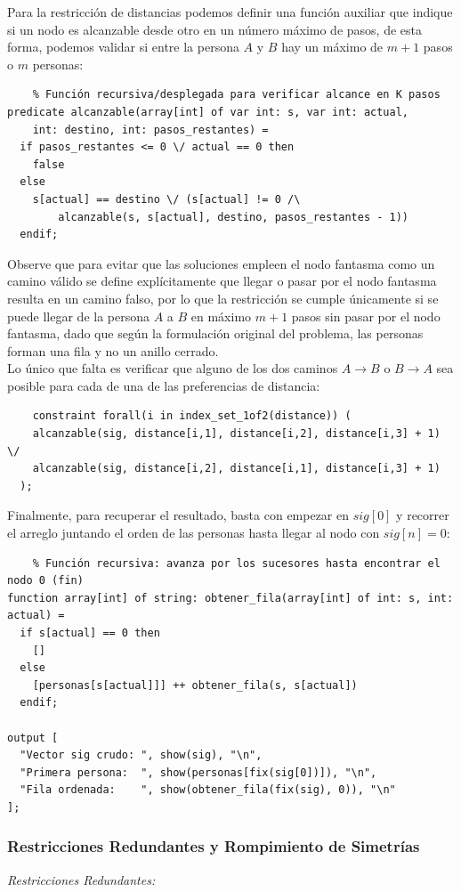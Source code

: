 Para la restricción de distancias podemos definir una función auxiliar que indique si un nodo es alcanzable desde otro en un número máximo de pasos, de esta forma, podemos validar si entre la persona $A$ y $B$ hay un máximo de $m+1$ pasos o $m$ personas:
\begin{verbatim}
    % Función recursiva/desplegada para verificar alcance en K pasos
predicate alcanzable(array[int] of var int: s, var int: actual,
    int: destino, int: pasos_restantes) =
  if pasos_restantes <= 0 \/ actual == 0 then
    false
  else
    s[actual] == destino \/ (s[actual] != 0 /\
        alcanzable(s, s[actual], destino, pasos_restantes - 1))
  endif;
\end{verbatim}
Observe que para evitar que las soluciones empleen el nodo fantasma como un camino válido se define explícitamente que llegar o pasar por el nodo fantasma resulta en un camino falso, por lo que la restricción se cumple únicamente si se puede llegar de la persona $A$ a $B$ en máximo $m+1$ pasos sin pasar por el nodo fantasma, dado que según la formulación original del problema, las personas forman una fila y no un anillo cerrado.\\

Lo único que falta es verificar que alguno de los dos caminos $A\to B$ o $B \to A$ sea posible para cada de una de las preferencias de distancia:
\begin{verbatim}
    constraint forall(i in index_set_1of2(distance)) (
    alcanzable(sig, distance[i,1], distance[i,2], distance[i,3] + 1) \/
    alcanzable(sig, distance[i,2], distance[i,1], distance[i,3] + 1)
  );
\end{verbatim}

Finalmente, para recuperar el resultado, basta con empezar en $sig[0]$ y recorrer el arreglo juntando el orden de las personas hasta llegar al nodo con $sig[n]=0$:
\begin{verbatim}
    % Función recursiva: avanza por los sucesores hasta encontrar el nodo 0 (fin)
function array[int] of string: obtener_fila(array[int] of int: s, int: actual) =
  if s[actual] == 0 then
    []
  else
    [personas[s[actual]]] ++ obtener_fila(s, s[actual])
  endif;

output [
  "Vector sig crudo: ", show(sig), "\n",
  "Primera persona:  ", show(personas[fix(sig[0])]), "\n",
  "Fila ordenada:    ", show(obtener_fila(fix(sig), 0)), "\n"
];
\end{verbatim}
\subsubsection{Restricciones Redundantes y Rompimiento de Simetrías}
\textit{Restricciones Redundantes:}

